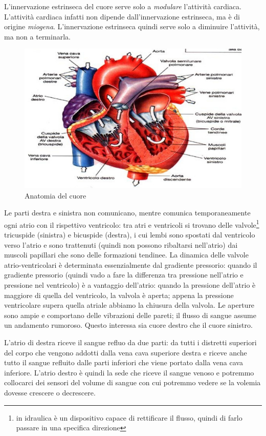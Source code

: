 \documentclass[a4paper,12pt]{article}
\begin{document}
L'innervazione estrinseca del cuore serve solo a \emph{modulare} l'attività cardiaca. L'attività cardiaca infatti non dipende dall'innervazione estrinseca, ma è di origine \emph{miogena}. L'innervazione estrinseca quindi serve solo a diminuire l'attività, ma non a terminarla. 
\begin{figure}[H]
\centering
\includegraphics[scale=0.4]{immagine/cuore.jpg}
\caption{Anatomia del cuore}
\end{figure}

Le parti destra e sinistra non comunicano, mentre comunica temporaneamente ogni atrio con il rispettivo ventricolo: tra atri e ventricoli si trovano delle valvole\footnote{in idraulica è un dispositivo capace di rettificare il flusso, quindi di farlo passare in una specifica direzione} tricuspide (sinistra) e bicuspide (destra), i cui lembi sono spostati dal ventricolo verso l'atrio e sono trattenuti (quindi non possono ribaltarsi nell'atrio) dai muscoli papillari che sono delle formazioni tendinee. La dinamica delle valvole atrio-ventricolari è determinata essenzialmente dal gradiente pressorio: quando il gradiente pressorio (quindi vado a fare la differenza tra pressione nell'atrio e pressione nel ventricolo) è a vantaggio dell'atrio: quando la pressione dell'atrio è maggiore di quella del ventricolo, la valvola è aperta; appena la pressione ventricolare supera quella atriale abbiamo la chiusura della valvola. Le aperture sono ampie e comportano delle vibrazioni delle pareti; il flusso di sangue assume un andamento rumoroso. Questo interessa sia cuore destro che il cuore sinistro.  

L'atrio di destra riceve il sangue refluo da due parti: da tutti i distretti superiori del corpo che vengono addotti dalla vena cava superiore destra e riceve anche tutto il sangue refluito dalle parti inferiori che viene portato dalla vena cava inferiore. L'atrio destro è quindi la sede che riceve il sangue venoso e potremmo collocarci dei sensori del volume di sangue con cui potremmo vedere se la volemia dovesse crescere o decrescere.
\end{document}

